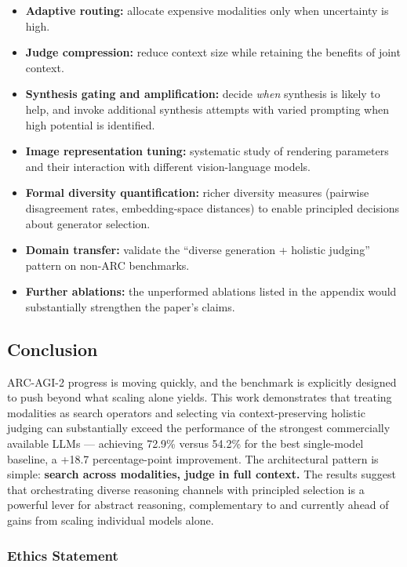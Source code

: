 \documentclass[10pt]{article}
\providecommand{\tightlist}{%
  \setlength{\itemsep}{0pt}\setlength{\parskip}{0pt}}
\begin{document}
\begin{itemize}
\tightlist
\item
  \textbf{Adaptive routing:} allocate expensive modalities only when
  uncertainty is high.
\item
  \textbf{Judge compression:} reduce context size while retaining the
  benefits of joint context.
\item
  \textbf{Synthesis gating and amplification:} decide \emph{when}
  synthesis is likely to help, and invoke additional synthesis attempts
  with varied prompting when high potential is identified.
\item
  \textbf{Image representation tuning:} systematic study of rendering
  parameters and their interaction with different vision-language
  models.
\item
  \textbf{Formal diversity quantification:} richer diversity measures
  (pairwise disagreement rates, embedding-space distances) to enable
  principled decisions about generator selection.
\item
  \textbf{Domain transfer:} validate the ``diverse generation + holistic
  judging'' pattern on non-ARC benchmarks.
\item
  \textbf{Further ablations:} the unperformed ablations listed in the
  appendix would substantially strengthen the paper's claims.
\end{itemize}

\hypertarget{conclusion}{%
\subsection{Conclusion}\label{conclusion}}

ARC-AGI-2 progress is moving quickly, and the benchmark is explicitly
designed to push beyond what scaling alone yields. This work
demonstrates that treating modalities as search operators and selecting
via context-preserving holistic judging can substantially exceed the
performance of the strongest commercially available LLMs --- achieving
72.9\% versus 54.2\% for the best single-model baseline, a +18.7
percentage-point improvement. The architectural pattern is simple:
\textbf{search across modalities, judge in full context.} The results
suggest that orchestrating diverse reasoning channels with principled
selection is a powerful lever for abstract reasoning, complementary to
and currently ahead of gains from scaling individual models alone.

\subsubsection*{Ethics Statement}
\end{document}
